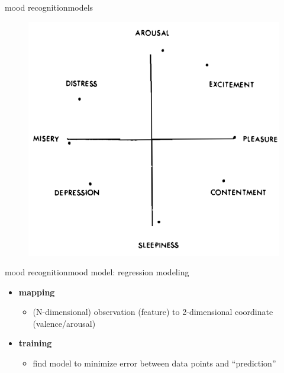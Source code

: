 \begin{frame}{mood recognition}{models}
\begin{itemize}
{\begin{figure}
                            \includegraphics[scale=.3]{graph/circumplex_affect}
                    \end{figure}
                    }
            \end{itemize}
        \end{frame}
                
        \begin{frame}{mood recognition}{mood model: regression modeling}
            \begin{itemize}
                \item   \textbf{mapping} 
                    \begin{itemize}
                        \item (N-dimensional) observation (feature) to 2-dimensional coordinate (valence/arousal)
                    \end{itemize}
                \bigskip
                \item   \textbf{training}
                    \begin{itemize}
                        \item find model to minimize error between data points and ``prediction''
                    \end{itemize}
            \end{itemize}
        \end{frame}
                
